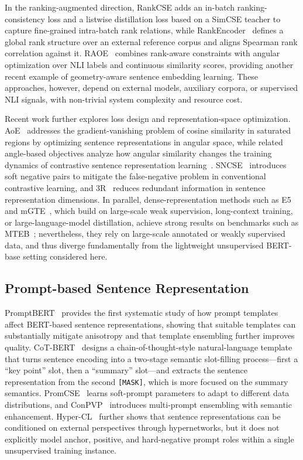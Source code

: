 \documentclass[a4paper,fleqn]{cas-dc}
\begin{document}
In the ranking-augmented direction, RankCSE adds an in-batch ranking-consistency loss and a listwise distillation loss based on a SimCSE teacher to capture fine-grained intra-batch rank relations, while RankEncoder~\cite{rankencoder} defines a global rank structure over an external reference corpus and aligns Spearman rank correlation against it. RAOE~\cite{raoe} combines rank-aware constraints with angular optimization over NLI labels and continuous similarity scores, providing another recent example of geometry-aware sentence embedding learning. These approaches, however, depend on external models, auxiliary corpora, or supervised NLI signals, with non-trivial system complexity and resource cost.

Recent work further explores loss design and representation-space optimization. AoE~\cite{angle} addresses the gradient-vanishing problem of cosine similarity in saturated regions by optimizing sentence representations in angular space, while related angle-based objectives analyze how angular similarity changes the training dynamics of contrastive sentence representation learning~\cite{anglebased}. SNCSE~\cite{sncse} introduces soft negative pairs to mitigate the false-negative problem in conventional contrastive learning, and 3R~\cite{threer} reduces redundant information in sentence representation dimensions. In parallel, dense-representation methods such as E5~\cite{e5} and mGTE~\cite{gte}, which build on large-scale weak supervision, long-context training, or large-language-model distillation, achieve strong results on benchmarks such as MTEB~\cite{mteb}; nevertheless, they rely on large-scale annotated or weakly supervised data, and thus diverge fundamentally from the lightweight unsupervised BERT-base setting considered here.

\subsection{Prompt-based Sentence Representation}

PromptBERT~\cite{promptbert} provides the first systematic study of how prompt templates affect BERT-based sentence representations, showing that suitable templates can substantially mitigate anisotropy and that template ensembling further improves quality. CoT-BERT~\cite{cotbert} designs a chain-of-thought-style natural-language template that turns sentence encoding into a two-stage semantic slot-filling process---first a ``key point'' slot, then a ``summary'' slot---and extracts the sentence representation from the second \texttt{[MASK]}, which is more focused on the summary semantics. PromCSE~\cite{promcse} learns soft-prompt parameters to adapt to different data distributions, and ConPVP~\cite{conpvp} introduces multi-prompt ensembling with semantic enhancement. Hyper-CL~\cite{hypercl} further shows that sentence representations can be conditioned on external perspectives through hypernetworks, but it does not explicitly model anchor, positive, and hard-negative prompt roles within a single unsupervised training instance.
\end{document}

